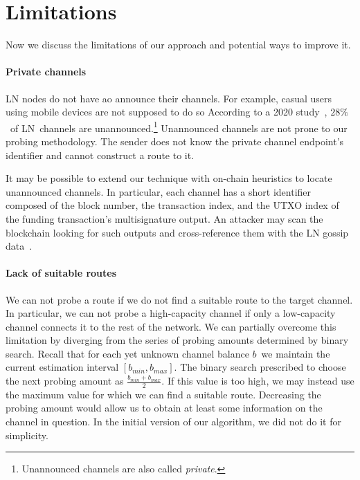 \pagebreak

\section{Limitations}

Now we discuss the limitations of our approach and potential ways to improve it.

\paragraph{Private channels}

LN nodes do not have ao announce their channels.
For example, casual users using mobile devices are not supposed to do so
According to a 2020 study~\cite{BitMEXPrivateChannels}, $28\%$~of LN~channels are unannounced.\footnote{Unannounced channels are also called \textit{private}.}
Unannounced channels are not prone to our probing methodology.
The sender does not know the private channel endpoint's identifier and cannot construct a route to it.

It may be possible to extend our technique with on-chain heuristics to locate unannounced channels.
In particular, each channel has a short identifier composed of the block number, the transaction index, and the UTXO index of the funding transaction's multisignature output.
An attacker may scan the blockchain looking for such outputs and cross-reference them with the LN gossip data~\cite{Pickhardt2020}.

\paragraph{Lack of suitable routes}

We can not probe a route if we do not find a suitable route to the target channel.
In particular, we can not probe a high-capacity channel if only a low-capacity channel connects it to the rest of the network.
We can partially overcome this limitation by diverging from the series of probing amounts determined by binary search.
Recall that for each yet unknown channel balance $b$~we maintain the current estimation interval $[b_{min}, b_{max}]$.
The binary search prescribed to choose the next probing amount as $\frac{b_{min} + b_{max}}{2}$.
If this value is too high, we may instead use the maximum value for which we can find a suitable route.
Decreasing the probing amount would allow us to obtain at least some information on the channel in question.
In the initial version of our algorithm, we did not do it for simplicity.

